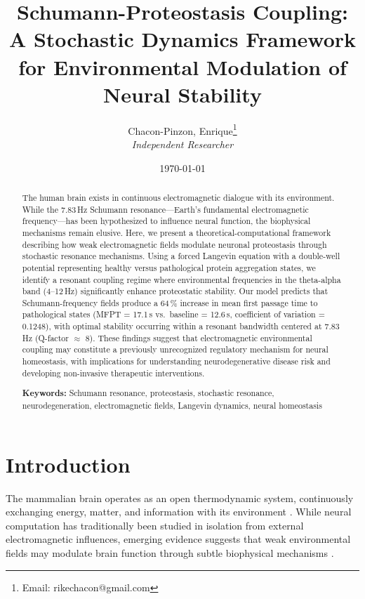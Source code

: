 \documentclass[10pt,a4paper]{article}
\title{Schumann-Proteostasis Coupling: A Stochastic Dynamics Framework for Environmental Modulation of Neural Stability}
\author{
    Chacon-Pinzon, Enrique\thanks{Email: rikechacon@gmail.com} \\
    \textit{Independent Researcher} \\
    \textit{}
}
\date{\today}
\begin{document}

\maketitle

\begin{abstract}
\noindent
The human brain exists in continuous electromagnetic dialogue with its environment. 
While the 7.83\,Hz Schumann resonance---Earth's fundamental electromagnetic frequency---has 
been hypothesized to influence neural function, the biophysical mechanisms remain elusive. 
Here, we present a theoretical-computational framework describing how weak electromagnetic 
fields modulate neuronal proteostasis through stochastic resonance mechanisms. Using a 
forced Langevin equation with a double-well potential representing healthy versus 
pathological protein aggregation states, we identify a resonant coupling regime where 
environmental frequencies in the theta-alpha band (4--12\,Hz) significantly enhance 
proteostatic stability. Our model predicts that Schumann-frequency fields produce a 
64\,\% increase in mean first passage time to pathological states (MFPT = 17.1\,s vs.\ 
baseline = 12.6\,s, coefficient of variation = 0.1248), with optimal stability occurring 
within a resonant bandwidth centered at 7.83\,Hz (Q-factor $\approx$ 8). These findings 
suggest that electromagnetic environmental coupling may constitute a previously unrecognized 
regulatory mechanism for neural homeostasis, with implications for understanding 
neurodegenerative disease risk and developing non-invasive therapeutic interventions.

\vspace{0.5em}
\noindent\textbf{Keywords:} Schumann resonance, proteostasis, stochastic resonance, 
neurodegeneration, electromagnetic fields, Langevin dynamics, neural homeostasis
\end{abstract}

\section{Introduction}

The mammalian brain operates as an open thermodynamic system, continuously exchanging 
energy, matter, and information with its environment \citep{friston2010free, palacios2019energy}. 
While neural computation has traditionally been studied in isolation from external 
electromagnetic influences, emerging evidence suggests that weak environmental fields 
may modulate brain function through subtle biophysical mechanisms \citep{frhlich2016endogenous, 
pickard2020electromagnetic}.
\end{document}
